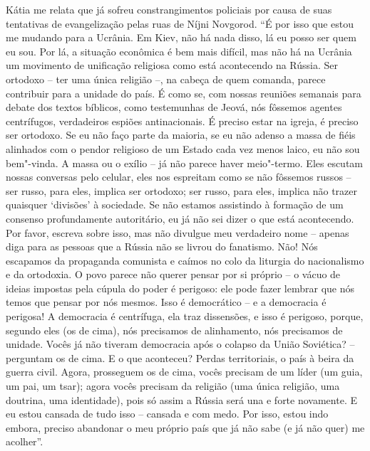 Kátia me relata que já sofreu constrangimentos policiais por causa de
suas tentativas de evangelização pelas ruas de Níjni Novgorod. ``É por
isso que estou me mudando para a Ucrânia. Em Kiev, não há nada disso, lá
eu posso ser quem eu sou. Por lá, a situação econômica é bem mais
difícil, mas não há na Ucrânia um movimento de unificação religiosa como
está acontecendo na Rússia. Ser ortodoxo -- ter uma única religião --,
na cabeça de quem comanda, parece contribuir para a unidade do país. É
como se, com nossas reuniões semanais para debate dos textos bíblicos,
como testemunhas de Jeová, nós fôssemos agentes centrífugos, verdadeiros
espiões antinacionais. É preciso estar na igreja, é preciso ser
ortodoxo. Se eu não faço parte da maioria, se eu não adenso a massa de
fiéis alinhados com o pendor religioso de um Estado cada vez menos
laico, eu não sou bem"-vinda. A massa ou o exílio -- já não parece haver
meio"-termo. Eles escutam nossas conversas pelo celular, eles nos
espreitam como se não fôssemos russos -- ser russo, para eles, implica
ser ortodoxo; ser russo, para eles, implica não trazer quaisquer
`divisões' à sociedade. Se não estamos assistindo à formação de um
consenso profundamente autoritário, eu já não sei dizer o que está
acontecendo. Por favor, escreva sobre isso, mas não divulgue meu
verdadeiro nome -- apenas diga para as pessoas que a Rússia não se
livrou do fanatismo. Não! Nós escapamos da propaganda comunista e caímos
no colo da liturgia do nacionalismo e da ortodoxia. O povo parece não
querer pensar por si próprio -- o vácuo de ideias impostas pela cúpula
do poder é perigoso: ele pode fazer lembrar que nós temos que pensar por
nós mesmos. Isso é democrático -- e a democracia é perigosa! A
democracia é centrífuga, ela traz dissensões, e isso é perigoso, porque,
segundo eles (os de cima), nós precisamos de alinhamento, nós precisamos
de unidade. Vocês já não tiveram democracia após o colapso da União
Soviética? -- perguntam os de cima. E o que aconteceu? Perdas
territoriais, o país à beira da guerra civil. Agora, prosseguem os de
cima, vocês precisam de um líder (um guia, um pai, um tsar); agora vocês
precisam da religião (uma única religião, uma doutrina, uma identidade),
pois só assim a Rússia será una e forte novamente. E eu estou cansada de
tudo isso -- cansada e com medo. Por isso, estou indo embora, preciso
abandonar o meu próprio país que já não sabe (e já não quer) me
acolher''.

